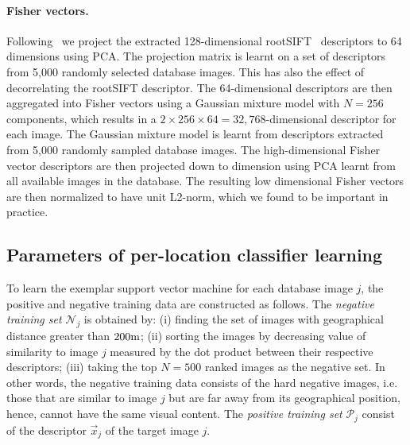       \paragraph{Fisher vectors.}
        Following~\cite{Jegou12} we project the extracted 128-dimensional rootSIFT~\cite{Arandjelovic12} descriptors to 64 dimensions using PCA. The projection matrix is learnt on a set of descriptors from 5,000 randomly selected database images. This has also the effect of decorrelating the rootSIFT descriptor. The 64-dimensional descriptors are then aggregated into Fisher vectors using a Gaussian mixture model with $N=256$ components, which results in a $2\times256\times64 = 32,768$-dimensional descriptor for each image.  
        The Gaussian mixture model is learnt from descriptors extracted from 5,000 randomly sampled database images. The  high-dimensional Fisher vector descriptors are then projected down to dimension
        using PCA learnt from all available images in the database. The resulting low dimensional Fisher vectors are then normalized to have unit L2-norm, which we found to be important in practice.
      
    \subsection{Parameters of per-location classifier learning}
      To learn the exemplar support vector machine for each database image $j$, the positive and negative training data are constructed as follows. 
      The \emph{negative training set} $\mathcal N_j$ is obtained by: (i) finding the set of images with geographical distance greater than $200{\rm m}$; (ii)  sorting the images by decreasing value of similarity to image $j$ measured by the dot product between their respective descriptors; (iii) taking the top $N=500$ ranked images as the negative set. 
      In other words, the negative training data consists of the hard negative images, i.e. those that are similar to image $j$ but are far away from its geographical position, hence, cannot have the same visual content. 
      The \emph{positive training set} $\mathcal P_j$ consist of the descriptor $\vec{x}_j$ of the target image $j$. 
      
